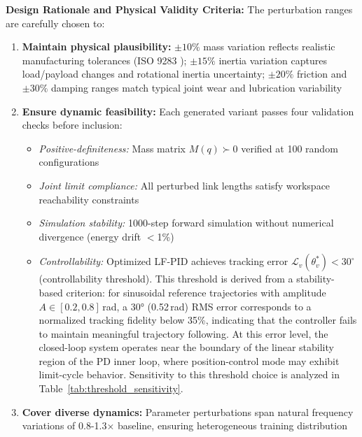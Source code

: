 \documentclass[DTMColor]{ROB-New}
\newcommand{\rev}[1]{{\color{blue}#1}}
\begin{document}
\textbf{Design Rationale and Physical Validity Criteria:} The perturbation ranges are carefully chosen to:
\begin{enumerate}[leftmargin=*, itemsep=2pt]
    \item \textbf{Maintain physical plausibility:} $\pm 10\%$ mass variation reflects realistic manufacturing tolerances (ISO 9283 \cite{iso9283}); $\pm 15\%$ inertia variation captures load/payload changes \rev{and rotational inertia uncertainty}; \rev{$\pm 20\%$ friction and $\pm 30\%$ damping ranges match typical joint wear and lubrication variability} \cite{cho2019identification}
    \item \textbf{Ensure dynamic feasibility:} Each generated variant passes four validation checks before inclusion:
    \begin{itemize}[leftmargin=*, itemsep=1pt]
        \item \textit{Positive-definiteness:} Mass matrix $M(q) \succ 0$ verified at 100 random configurations
        \item \textit{Joint limit compliance:} All perturbed link lengths satisfy workspace reachability constraints
        \item \textit{Simulation stability:} 1000-step forward simulation without numerical divergence (energy drift $<$1\%)
        \item \textit{Controllability:} Optimized LF-PID achieves tracking error $\mathcal{L}_v(\theta^*_v) < 30^\circ$ (controllability threshold). {\color{blue}This threshold is derived from a stability-based criterion: for sinusoidal reference trajectories with amplitude $A \in [0.2, 0.8]$\,rad, a 30° (0.52\,rad) RMS error corresponds to a normalized tracking fidelity below 35\%, indicating that the controller fails to maintain meaningful trajectory following. At this error level, the closed-loop system operates near the boundary of the linear stability region of the PD inner loop, where position-control mode may exhibit limit-cycle behavior. Sensitivity to this threshold choice is analyzed in Table~\ref{tab:threshold_sensitivity}.}
    \end{itemize}
    \item \textbf{Cover diverse dynamics:} Parameter perturbations span natural frequency variations of 0.8-1.3× baseline, ensuring heterogeneous training distribution
\end{enumerate}
\end{document}
